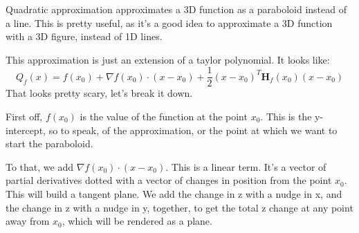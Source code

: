 \documentclass[12pt, letterpaper]{article}
\begin{document}
Quadratic approximation approximates a 3D function as a paraboloid instead of a line. This is pretty useful, as it's a good idea to approximate a 3D function with a 3D figure, instead of 1D lines.

This approximation is just an extension of a taylor polynomial. It looks like:
\begin{displaymath}
    Q_f(x) = f(x_0) + \nabla f(x_0)\cdot(x-x_0)+\frac{1}{2}(x-x_0)^T\mathbf{H}_f(x_0)(x-x_0)
\end{displaymath}
That looks pretty scary, let's break it down.

First off, $f(x_0)$ is the value of the function at the point $x_0$. This is the y-intercept, so to speak, of the approximation, or the point at which we want to start the paraboloid.

To that, we add $\nabla f(x_0)\cdot(x-x_0)$. This is a linear term. It's a vector of partial derivatives dotted with a vector of changes in position from the point $x_0$. This will build a tangent plane. We add the change in z with a nudge in x, and the change in z with a nudge in y, together, to get the total z change at any point away from $x_0$, which will be rendered as a plane.
\end{document}
